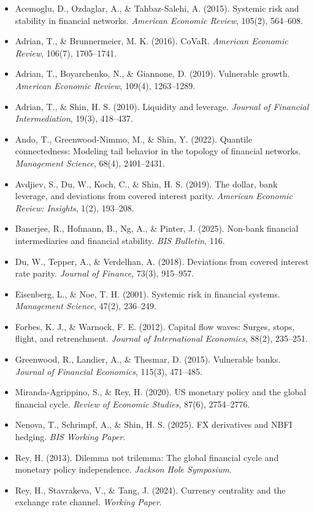 \documentclass[11pt,a4paper]{article}
\begin{document}
\begin{itemize}
\item Acemoglu, D., Ozdaglar, A., \& Tahbaz-Salehi, A. (2015). Systemic risk and stability in financial networks. \textit{American Economic Review}, 105(2), 564--608.
\item Adrian, T., \& Brunnermeier, M. K. (2016). CoVaR. \textit{American Economic Review}, 106(7), 1705--1741.
\item Adrian, T., Boyarchenko, N., \& Giannone, D. (2019). Vulnerable growth. \textit{American Economic Review}, 109(4), 1263--1289.
\item Adrian, T., \& Shin, H. S. (2010). Liquidity and leverage. \textit{Journal of Financial Intermediation}, 19(3), 418--437.
\item Ando, T., Greenwood-Nimmo, M., \& Shin, Y. (2022). Quantile connectedness: Modeling tail behavior in the topology of financial networks. \textit{Management Science}, 68(4), 2401--2431.
\item Avdjiev, S., Du, W., Koch, C., \& Shin, H. S. (2019). The dollar, bank leverage, and deviations from covered interest parity. \textit{American Economic Review: Insights}, 1(2), 193--208.
\item Banerjee, R., Hofmann, B., Ng, A., \& Pinter, J. (2025). Non-bank financial intermediaries and financial stability. \textit{BIS Bulletin}, 116.
\item Du, W., Tepper, A., \& Verdelhan, A. (2018). Deviations from covered interest rate parity. \textit{Journal of Finance}, 73(3), 915--957.
\item Eisenberg, L., \& Noe, T. H. (2001). Systemic risk in financial systems. \textit{Management Science}, 47(2), 236--249.
\item Forbes, K. J., \& Warnock, F. E. (2012). Capital flow waves: Surges, stops, flight, and retrenchment. \textit{Journal of International Economics}, 88(2), 235--251.
\item Greenwood, R., Landier, A., \& Thesmar, D. (2015). Vulnerable banks. \textit{Journal of Financial Economics}, 115(3), 471--485.
\item Miranda-Agrippino, S., \& Rey, H. (2020). US monetary policy and the global financial cycle. \textit{Review of Economic Studies}, 87(6), 2754--2776.
\item Nenova, T., Schrimpf, A., \& Shin, H. S. (2025). FX derivatives and NBFI hedging. \textit{BIS Working Paper}.
\item Rey, H. (2013). Dilemma not trilemma: The global financial cycle and monetary policy independence. \textit{Jackson Hole Symposium}.
\item Rey, H., Stavrakeva, V., \& Tang, J. (2024). Currency centrality and the exchange rate channel. \textit{Working Paper}.

\end{itemize}
\end{document}
